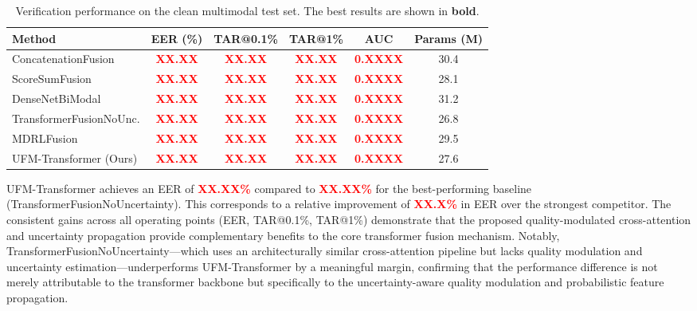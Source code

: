 \documentclass[10pt,journal,compsoc]{IEEEtran}
\begin{document}
\begin{table}[htbp]
\centering
\caption{Verification performance on the clean multimodal test set. The best results are shown in \textbf{bold}.}
\label{tab:main_results}
\begin{tabular}{l c c c c c}
\hline
\textbf{Method} & \textbf{EER (\%)} & \textbf{TAR@0.1\%} & \textbf{TAR@1\%} & \textbf{AUC} & \textbf{Params (M)} \\
\hline
ConcatenationFusion & \textcolor{red}{\textbf{XX.XX}} & \textcolor{red}{\textbf{XX.XX}} & \textcolor{red}{\textbf{XX.XX}} & \textcolor{red}{\textbf{0.XXXX}} & 30.4 \\ %
ScoreSumFusion & \textcolor{red}{\textbf{XX.XX}} & \textcolor{red}{\textbf{XX.XX}} & \textcolor{red}{\textbf{XX.XX}} & \textcolor{red}{\textbf{0.XXXX}} & 28.1 \\ %
DenseNetBiModal & \textcolor{red}{\textbf{XX.XX}} & \textcolor{red}{\textbf{XX.XX}} & \textcolor{red}{\textbf{XX.XX}} & \textcolor{red}{\textbf{0.XXXX}} & 31.2 \\ %
TransformerFusionNoUnc. & \textcolor{red}{\textbf{XX.XX}} & \textcolor{red}{\textbf{XX.XX}} & \textcolor{red}{\textbf{XX.XX}} & \textcolor{red}{\textbf{0.XXXX}} & 26.8 \\ %
MDRLFusion & \textcolor{red}{\textbf{XX.XX}} & \textcolor{red}{\textbf{XX.XX}} & \textcolor{red}{\textbf{XX.XX}} & \textcolor{red}{\textbf{0.XXXX}} & 29.5 \\ %
\hline
UFM-Transformer (Ours) & \textcolor{red}{\textbf{XX.XX}} & \textcolor{red}{\textbf{XX.XX}} & \textcolor{red}{\textbf{XX.XX}} & \textcolor{red}{\textbf{0.XXXX}} & 27.6 \\ %
\hline
\end{tabular}
\end{table}

UFM-Transformer achieves an EER of \textcolor{red}{\textbf{XX.XX\%}} compared to \textcolor{red}{\textbf{XX.XX\%}} for the best-performing baseline (TransformerFusionNoUncertainty). %
This corresponds to a relative improvement of \textcolor{red}{\textbf{XX.X\%}} in EER over the strongest competitor. %
The consistent gains across all operating points (EER, TAR@0.1\%, TAR@1\%) demonstrate that the proposed quality-modulated cross-attention and uncertainty propagation provide complementary benefits to the core transformer fusion mechanism. Notably, TransformerFusionNoUncertainty---which uses an architecturally similar cross-attention pipeline but lacks quality modulation and uncertainty estimation---underperforms UFM-Transformer by a meaningful margin, confirming that the performance difference is not merely attributable to the transformer backbone but specifically to the uncertainty-aware quality modulation and probabilistic feature propagation.
\end{document}
